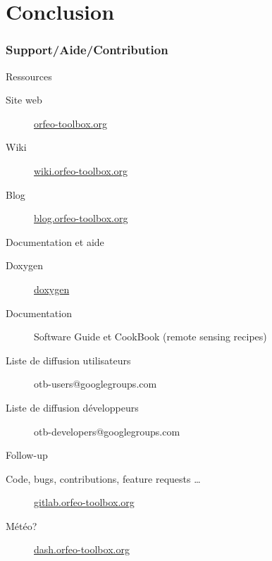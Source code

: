 \documentclass[8pt]{beamer}
\begin{document}
\section{Conclusion}

\begin{frame}
\frametitle{Support/Aide/Contribution}
\vspace{-0.2cm}
\begin{block}{Ressources}
\vspace{-0.2cm}
\begin{description}
\item[Site web] \href{http://www.orfeo-toolbox.org}{orfeo-toolbox.org}
\item[Wiki] \href{http://wiki.orfeo-toolbox.org}{wiki.orfeo-toolbox.org}
\item[Blog] \href{http://blog.orfeo-toolbox.org}{blog.orfeo-toolbox.org}
\end{description}
\end{block}
\vspace{-0.2cm}
\begin{block}{Documentation et aide}
\vspace{-0.2cm}
\begin{description}
\item[Doxygen] \href{http://www.orfeo-toolbox.org/doxygen/}{doxygen}
\item[Documentation] Software Guide et CookBook (remote sensing recipes)
\item[Liste de diffusion utilisateurs] otb-users@googlegroups.com
\item[Liste de diffusion développeurs] otb-developers@googlegroups.com
\end{description}
\end{block}
\vspace{-0.2cm}
\begin{block}{Follow-up}
\vspace{-0.2cm}
\begin{description}
\item[Code, bugs, contributions, feature requests \ldots] \href{https://gitlab.orfeo-toolbox.org/orfeotoolbox/otb}{gitlab.orfeo-toolbox.org}
\item[Météo?] \href{http://dash.orfeo-toolbox.org}{dash.orfeo-toolbox.org}
\end{description}
\end{block}
\end{frame}
\end{document}
